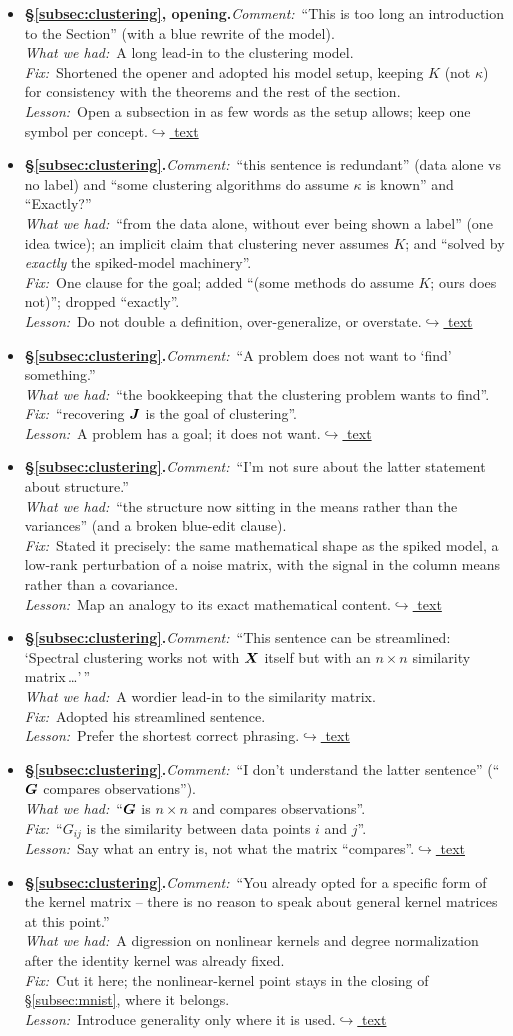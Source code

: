 \documentclass[12pt]{article}
\newcommand{\gdlogentry}[6]{%
  \item[\textcolor{thesisRev}{$\star$\,\ref{gdrev:#1}}]\hypertarget{gdlog:#1}{}%
  \textbf{#2.}\enspace\emph{Comment:}~#3\\
  \emph{What we had:}~#4\\
  \emph{Fix:}~#5\\
  \emph{Lesson:}~#6\enspace\hyperlink{gdtext:#1}{\textcolor{thesisLink}{$\hookrightarrow$ text}}}
\begin{document}
\begin{itemize}[leftmargin=2.4em,itemsep=0.55em]
\gdlogentry{r4-clustering-intro}{\S\ref{subsec:clustering}, opening}{``This is too long an introduction to the Section'' (with a blue rewrite of the model).}{A long lead-in to the clustering model.}{Shortened the opener and adopted his model setup, keeping \(K\) (not \(\kappa\)) for consistency with the theorems and the rest of the section.}{Open a subsection in as few words as the setup allows; keep one symbol per concept.}

\gdlogentry{r4-clustering-goal}{\S\ref{subsec:clustering}}{``this sentence is redundant'' (data alone vs no label) and ``some clustering algorithms do assume \(\kappa\) is known'' and ``Exactly?''}{``from the data alone, without ever being shown a label'' (one idea twice); an implicit claim that clustering never assumes \(K\); and ``solved by \emph{exactly} the spiked-model machinery''.}{One clause for the goal; added ``(some methods do assume \(K\); ours does not)''; dropped ``exactly''.}{Do not double a definition, over-generalize, or overstate.}

\gdlogentry{r4-bookkeeping}{\S\ref{subsec:clustering}}{``A problem does not want to `find' something.''}{``the bookkeeping that the clustering problem wants to find''.}{``recovering \(\bm{J}\) is the goal of clustering''.}{A problem has a goal; it does not want.}

\gdlogentry{r4-lowrank}{\S\ref{subsec:clustering}}{``I'm not sure about the latter statement about structure.''}{``the structure now sitting in the means rather than the variances'' (and a broken blue-edit clause).}{Stated it precisely: the same mathematical shape as the spiked model, a low-rank perturbation of a noise matrix, with the signal in the column means rather than a covariance.}{Map an analogy to its exact mathematical content.}

\gdlogentry{r4-similarity}{\S\ref{subsec:clustering}}{``This sentence can be streamlined: `Spectral clustering works not with \(\bm{X}\) itself but with an \(n\times n\) similarity matrix\,\dots'\,''}{A wordier lead-in to the similarity matrix.}{Adopted his streamlined sentence.}{Prefer the shortest correct phrasing.}

\gdlogentry{r4-reversal}{\S\ref{subsec:clustering}}{``I don't understand the latter sentence'' (``\(\bm{G}\) compares observations'').}{``\(\bm{G}\) is \(n \times n\) and compares observations''.}{``\(G_{ij}\) is the similarity between data points \(i\) and \(j\)''.}{Say what an entry is, not what the matrix ``compares''.}

\gdlogentry{r4-kernels-cut}{\S\ref{subsec:clustering}}{``You already opted for a specific form of the kernel matrix -- there is no reason to speak about general kernel matrices at this point.''}{A digression on nonlinear kernels and degree normalization after the identity kernel was already fixed.}{Cut it here; the nonlinear-kernel point stays in the closing of \S\ref{subsec:mnist}, where it belongs.}{Introduce generality only where it is used.}


\end{itemize}
\end{document}
